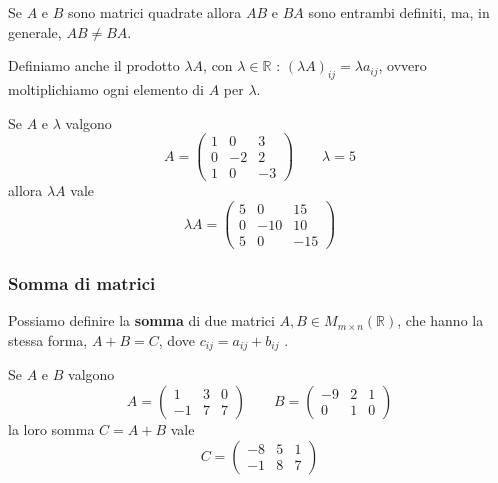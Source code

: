 \documentclass[
  a4paper,
]{article}
\begin{document}
\begin{observationbox}
Se \(A\) e \(B\) sono matrici quadrate allora \(AB\) e \(BA\) sono
entrambi definiti, ma, in generale, \(AB \not = BA\).
\end{observationbox}

\begin{definitionbox}
Definiamo anche il prodotto \(\lambda A\), con
\(\lambda \in \mathbb{R}\) : \((\lambda A)_{ij} = \lambda a_{ij}\),
ovvero moltiplichiamo ogni elemento di \(A\) per \(\lambda\).
\end{definitionbox}

\begin{examplebox}
Se \(A\) e \(\lambda\) valgono \[
A=
\begin{pmatrix}
1 & 0 & 3\\
0 & -2 & 2\\
1 & 0 & -3
\end{pmatrix}
\qquad
\lambda = 5
\] allora \(\lambda A\) vale \[
\lambda A=
\begin{pmatrix}
5 & 0 & 15\\
0 & -10 & 10\\
5 & 0 & -15
\end{pmatrix}
\]
\end{examplebox}

\hypertarget{somma-di-matrici}{%
\subsubsection{Somma di matrici}\label{somma-di-matrici}}

\begin{definitionbox}
Possiamo definire la \textbf{somma} di due matrici
\(A, B \in M_{m \times n}(\mathbb{R})\), che hanno la stessa forma,
\(A + B = C\), dove \(c_{ij} = a_{ij} + b_{ij}\) .
\end{definitionbox}

\begin{examplebox}
Se \(A\) e \(B\) valgono \[
A=
\begin{pmatrix}
1 & 3 & 0\\
-1 & 7 & 7
\end{pmatrix}
\qquad
B=
\begin{pmatrix}
-9 & 2 & 1\\
0 & 1 & 0
\end{pmatrix}
\] la loro somma \(C = A + B\) vale \[
C=
\begin{pmatrix}
-8 & 5 & 1\\
-1 & 8 & 7
\end{pmatrix}
\]
\end{examplebox}
\end{document}
